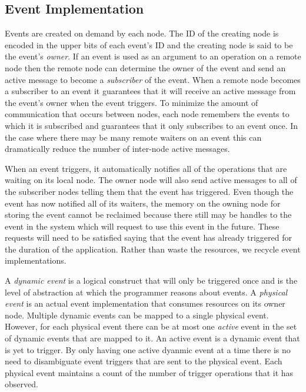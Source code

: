 \subsection{Event Implementation}
\label{subsec:eventimpl}
Events are created on demand by each node.  The ID of the creating node is encoded
in the upper bits of each event's ID and the creating node is said to be the 
event's {\em owner}.  If an event is used as an argument to an
operation on a remote node then the remote node can determine the owner of 
the event and send an active message to become a {\em subscriber} of the event.  When a
remote node becomes a subscriber to an event it guarantees that it will receive an active
message from the event's owner when the event triggers.  To minimize the amount
of communication that occurs between nodes, each node remembers the events to which it
is subscribed and guarantees that it only subscribes to an event once.  In the case
where there may be many remote waiters on an event 
this can dramatically reduce the number of inter-node active messages.

When an event triggers, it automatically notifies all of the operations that are waiting
on its local node.  The owner node will also send active messages to all of the subscriber nodes
telling them that the event has triggered.  Even though the event has now notified all of
its waiters, the memory on the owning node for storing the event cannot be reclaimed 
because there still may be handles to the event in the system which will request to
use this event in the future.  These requests will need to be satisfied saying that 
the event has already triggered for the duration of the application.  Rather than waste
the resources, we recycle event implementations.

A {\em dynamic event} is a logical construct that will only be triggered once and is the level
of abstraction at which the programmer reasons about events.  A {\em physical event} is an
actual event implementation that consumes resources on its owner node.  Multiple dynamic events
can be mapped to a single physical event.  However, for each physical event there can be at most
one {\em active} event in the set of dynamic events that are mapped to it.  An active event is a 
dynamic event that is yet to trigger.  By only having one active dyanmic event at a time 
there is no need to disambiguate event triggers that are sent to the physical event.  Each
physical event maintains a count of the number of trigger operations that it has observed.

